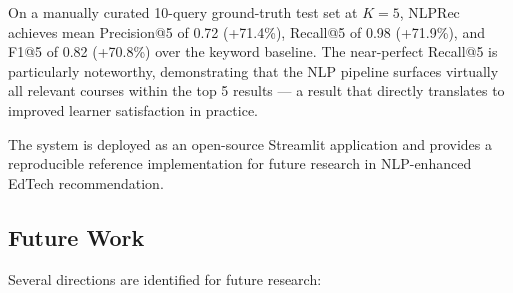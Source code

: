 \documentclass[12pt, a4paper]{article}
\begin{document}
On a manually curated 10-query ground-truth test set at $K=5$, NLPRec achieves mean
Precision@5 of 0.72 (+71.4\%), Recall@5 of 0.98 (+71.9\%), and F1@5 of 0.82 (+70.8\%) over
the keyword baseline. The near-perfect Recall@5 is particularly noteworthy, demonstrating that
the NLP pipeline surfaces virtually all relevant courses within the top 5 results — a result
that directly translates to improved learner satisfaction in practice.

The system is deployed as an open-source Streamlit application and provides a reproducible
reference implementation for future research in NLP-enhanced EdTech recommendation.

\subsection{Future Work}

Several directions are identified for future research:
\end{document}
